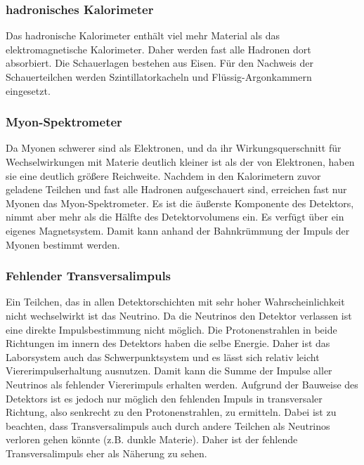 \subsubsection{hadronisches Kalorimeter}
Das hadronische Kalorimeter enthält viel mehr Material als das elektromagnetische Kalorimeter.
Daher werden fast alle Hadronen dort absorbiert.
Die Schauerlagen bestehen aus Eisen.
Für den Nachweis der Schauerteilchen werden Szintillatorkacheln und Flüssig-Argonkammern eingesetzt.

\subsubsection{Myon-Spektrometer}
Da Myonen schwerer sind als Elektronen, und da ihr Wirkungsquerschnitt für Wechselwirkungen mit Materie deutlich kleiner ist als der von Elektronen, haben sie eine deutlich größere Reichweite.
Nachdem in den Kalorimetern zuvor geladene Teilchen und fast alle Hadronen aufgeschauert sind, erreichen fast nur Myonen das Myon-Spektrometer.
Es ist die äußerste Komponente des Detektors, nimmt aber mehr als die Hälfte des Detektorvolumens ein.
Es verfügt über ein eigenes Magnetsystem.
Damit kann anhand der Bahnkrümmung der Impuls der Myonen bestimmt werden.

\subsubsection{Fehlender Transversalimpuls}
Ein Teilchen, das in allen Detektorschichten mit sehr hoher Wahrscheinlichkeit nicht wechselwirkt ist das Neutrino.
Da die Neutrinos den Detektor verlassen ist eine direkte Impulsbestimmung nicht möglich.
Die Protonenstrahlen in beide Richtungen im innern des Detektors haben die selbe Energie.
Daher ist das Laborsystem auch das Schwerpunktsystem und es lässt sich relativ leicht Viererimpulserhaltung ausnutzen.
Damit kann die Summe der Impulse aller Neutrinos als fehlender Viererimpuls erhalten werden.
Aufgrund der Bauweise des Detektors ist es jedoch nur möglich den fehlenden Impuls in transversaler Richtung, also senkrecht zu den Protonenstrahlen, zu ermitteln.
Dabei ist zu beachten, dass Transversalimpuls auch durch andere Teilchen als Neutrinos verloren gehen könnte (z.B. dunkle Materie).
Daher ist der fehlende Transversalimpuls eher als Näherung zu sehen.

